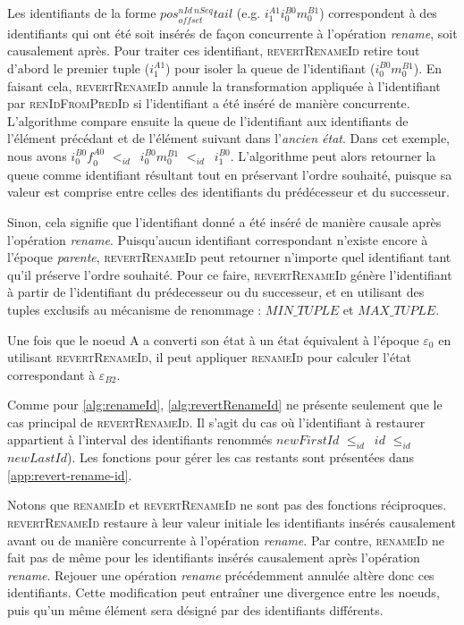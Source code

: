 \documentclass[12pt]{thesul}
\newcommand{\eg}{e.g. }
\newcommand{\trm}[1]{\mathit{#1}}
\newcommand{\id}[3]{$\trm{#1}^{\trm{#2}}_{\trm{#3}}$}
\newcommand{\epoch}[1]{$\varepsilon_{#1}$}
\newcommand{\lid}{$<_{id}$~}
\newcommand{\leqid}{$\leq_{id}$~}
\begin{document}
Les identifiants de la forme \id{pos}{nId~nSeq}{offset}$\trm{tail}$ (\eg \id{i}{A1}{1}\id{i}{B0}{0}\id{m}{B1}{0}) correspondent à des identifiants qui ont été soit insérés de façon concurrente à l'opération \emph{rename}, soit causalement après.
Pour traiter ces identifiant, \textsc{revertRenameId} retire tout d'abord le premier tuple (\id{i}{A1}{1}) pour isoler la queue de l'identifiant (\id{i}{B0}{0}\id{m}{B1}{0}).
En faisant cela, \textsc{revertRenameId} annule la transformation appliquée à l'identifiant par \textsc{renIdFromPredId} si l'identifiant a été inséré de manière concurrente.
L'algorithme compare ensuite la queue de l'identifiant aux identifiants de l'élément précédant et de l'élément suivant dans l'\emph{ancien état}.
Dans cet exemple, nous avons \id{i}{B0}{0}\id{f}{A0}{0} \lid \id{i}{B0}{0}\id{m}{B1}{0} \lid \id{i}{B0}{1}.
L'algorithme peut alors retourner la queue comme identifiant résultant tout en préservant l'ordre souhaité, puisque sa valeur est comprise entre celles des identifiants du prédécesseur et du successeur.

Sinon, cela signifie que l'identifiant donné a été inséré de manière causale après l'opération \emph{rename}.
Puisqu'aucun identifiant correspondant n'existe encore à l'époque \emph{parente}, \textsc{revertRenameId} peut retourner n'importe quel identifiant tant qu'il préserve l'ordre souhaité.
Pour ce faire, \textsc{revertRenameId} génère l'identifiant à partir de l'identifiant du prédecesseur ou du successeur, et en utilisant des tuples exclusifs au mécanisme de renommage : $\trm{MIN\_TUPLE}$ et $\trm{MAX\_TUPLE}$.


Une fois que le noeud A a converti son état à un état équivalent à l'époque \epoch{0} en utilisant \textsc{revertRenameId}, il peut appliquer \textsc{renameId} pour calculer l'état correspondant à \epoch{B2}.

Comme pour \autoref{alg:renameId}, \autoref{alg:revertRenameId} ne présente seulement que le cas principal de \textsc{revertRenameId}.
Il s'agit du cas où l'identifiant à restaurer appartient à l'interval des identifiants renommés $\trm{newFirstId}$ \leqid $\trm{id}$ \leqid $\trm{newLastId}$).
Les fonctions pour gérer les cas restants sont présentées dans \autoref{app:revert-rename-id}.

Notons que \textsc{renameId} et \textsc{revertRenameId} ne sont pas des fonctions réciproques.
\textsc{revertRenameId} restaure à leur valeur initiale les identifiants insérés causalement avant ou de manière concurrente à l'opération \emph{rename}.
Par contre, \textsc{renameId} ne fait pas de même pour les identifiants insérés causalement après l'opération \emph{rename}.
Rejouer une opération \emph{rename} précédemment annulée altère donc ces identifiants.
Cette modification peut entraîner une divergence entre les noeuds, puis qu'un même élément sera désigné par des identifiants différents.
\end{document}
